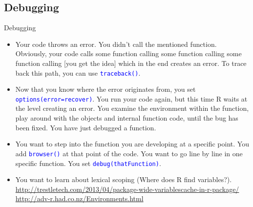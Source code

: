\documentclass[xcolor=table,       handout,    xcolor=dvipsnames]{beamer}\usepackage[]{graphicx}\usepackage[]{color}
\newcommand{\rcode}[1]{\texttt{\textcolor{Blue}{#1}}} %
\begin{document}

\subsection{Debugging}


\begin{frame}[fragile]{Debugging}
\begin{itemize}[<+->]
\item Your code throws an error.
You didn't call the mentioned function. 
Obviously, your code calls some function calling some function calling some function calling [you get the idea] which in the end creates an error.
To trace back this path, you can use \rcode{traceback()}.

\item Now that you know where the error originates from, you set \rcode{options(error=recover)}.
You run your code again, but this time R waits at the level creating an error.
You examine the environment within the function, play around with the objects and internal function code, until the bug has been fixed. 
You have just debugged a function.

\item You want to step into the function you are developing at a specific point.
You add \rcode{browser()} at that point of the code.
You want to go line by line in one specific function. You set \rcode{debug(thatFunction)}.

\item You want to learn about lexical scoping (Where does R find variables?).\\
\small
\href{http://trestletech.com/2013/04/package-wide-variablescache-in-r-package/}{http://trestletech.com/2013/04/package-wide-variablescache-in-r-package/}
\href{http://adv-r.had.co.nz/Environments.html}{http://adv-r.had.co.nz/Environments.html}
\end{itemize}
\end{frame}

\end{document}
